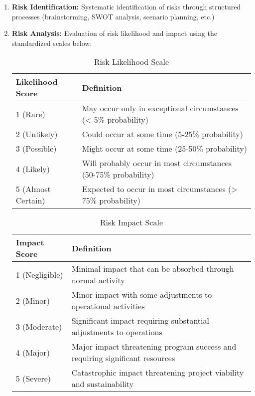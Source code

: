 \begin{enumerate}
    \item \textbf{Risk Identification:} Systematic identification of risks through structured processes (brainstorming, SWOT analysis, scenario planning, etc.)
    
    \item \textbf{Risk Analysis:} Evaluation of risk likelihood and impact using the standardized scales below:
    
    \begin{table}[h]
    \centering
    \begin{tabular}{|p{3cm}|p{9cm}|}
    \hline
    \textbf{Likelihood Score} & \textbf{Definition} \\
    \hline
    1 (Rare) & May occur only in exceptional circumstances (< 5\% probability) \\
    \hline
    2 (Unlikely) & Could occur at some time (5-25\% probability) \\
    \hline
    3 (Possible) & Might occur at some time (25-50\% probability) \\
    \hline
    4 (Likely) & Will probably occur in most circumstances (50-75\% probability) \\
    \hline
    5 (Almost Certain) & Expected to occur in most circumstances (> 75\% probability) \\
    \hline
    \end{tabular}
    \caption{Risk Likelihood Scale}
    \end{table}
    
    \begin{table}[h]
    \centering
    \begin{tabular}{|p{3cm}|p{9cm}|}
    \hline
    \textbf{Impact Score} & \textbf{Definition} \\
    \hline
    1 (Negligible) & Minimal impact that can be absorbed through normal activity \\
    \hline
    2 (Minor) & Minor impact with some adjustments to operational activities \\
    \hline
    3 (Moderate) & Significant impact requiring substantial adjustments to operations \\
    \hline
    4 (Major) & Major impact threatening program success and requiring significant resources \\
    \hline
    5 (Severe) & Catastrophic impact threatening project viability and sustainability \\
    \hline
    \end{tabular}
    \caption{Risk Impact Scale}
    \end{table}
    

\end{enumerate}
